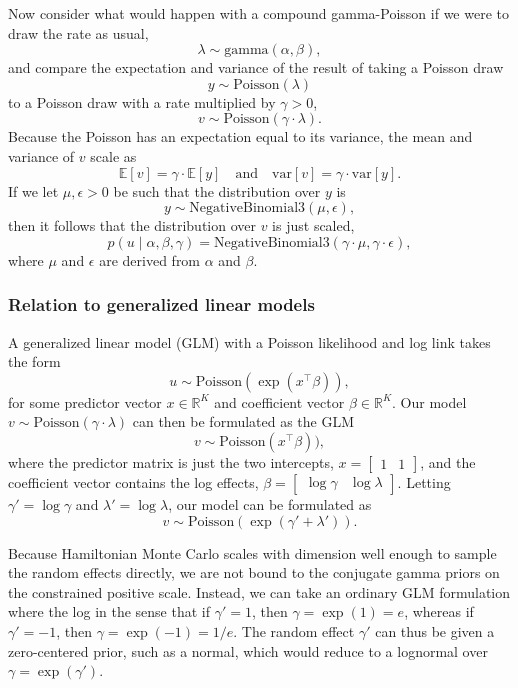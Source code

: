 \documentclass[11pt]{report}
\begin{document}
Now consider what would happen with a compound gamma-Poisson if we
were to draw the rate as usual,
\[
  \lambda \sim \textrm{gamma}(\alpha, \beta),
\]
and compare the expectation and variance of the result of taking a
Poisson draw
\[
  y \sim \textrm{Poisson}(\lambda)
\]
to a Poisson draw with a rate multiplied by $\gamma > 0$,
\[
  v \sim \textrm{Poisson}(\gamma \cdot \lambda).
\]
Because the Poisson has an expectation equal to its variance, the mean
and variance of $v$ scale as
\[
  \mathbb{E}[v] = \gamma \cdot \mathbb{E}[y]
  \quad \textrm{and} \quad
  \textrm{var}[v] = \gamma \cdot \textrm{var}[y].
\]
If we let $\mu, \epsilon > 0$ be such that the distribution over $y$
is
\[
  y \sim \textrm{NegativeBinomial3}(\mu, \epsilon),
\]
then it follows that the distribution over $v$ is just scaled,
\[
  p(u \mid \alpha, \beta, \gamma)
  = \textrm{NegativeBinomial3}(\gamma \cdot \mu, \gamma \cdot \epsilon),
\]
where $\mu$ and $\epsilon$ are derived from $\alpha$ and $\beta$.

\subsubsection{Relation to generalized linear models}

A generalized linear model (GLM) with a Poisson likelihood and log
link takes the form
\[
  u \sim \textrm{Poisson}(\exp(x^{\top} \beta)),
\]
for some predictor vector $x \in \mathbb{R}^K$ and coefficient vector
$\beta \in \mathbb{R}^K$.  Our model $v \sim \textrm{Poisson}(\gamma
\cdot \lambda)$ can then be formulated as the GLM
\[
  v \sim \textrm{Poisson}(x^{\top} \beta)),
\]
where the predictor matrix is just the two intercepts, $x =
\begin{bmatrix} 1 & 1 \end{bmatrix}$, and the coefficient vector
contains the log effects, $\beta = \begin{bmatrix} \log \gamma & \log
  \lambda \end{bmatrix}$.  Letting $\gamma' = \log \gamma$ and
$\lambda' = \log \lambda$, our model can be formulated as
\[
  v \sim \textrm{Poisson}(\exp(\gamma' + \lambda')).
\]

Because Hamiltonian Monte Carlo scales with dimension well enough to
sample the random effects directly, we are not bound to the conjugate
gamma priors on the constrained positive scale. Instead, we can take
an ordinary GLM formulation where the log in the sense that if
$\gamma' = 1$, then $\gamma = \exp(1) = e$, whereas if $\gamma' = -1$,
then $\gamma = \exp(-1) = 1 / e$. The random effect $\gamma'$ can thus
be given a zero-centered prior, such as a normal, which would reduce
to a lognormal over $\gamma = \exp(\gamma')$.
\end{document}
